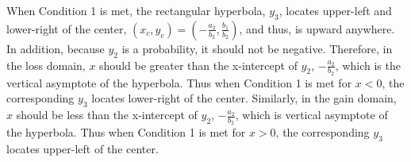 \documentclass[11pt, a4paper]{article}
\begin{document}
\noindent
When Condition 1 is met, the rectangular hyperbola, $y_3$, locates upper-left and lower-right of the center, $(x_c, y_c) = (-\frac{a_2}{b_2}, \frac{b_1}{b_2})$, and thus, is upward anywhere.\\

\noindent
In addition, because $y_2$ is a probability, it should not be negative. Therefore, in the loss domain, $x$ should be greater than the x-intercept of $y_2$, $-\frac{a_2}{b_2}$, which is the vertical asymptote of the hyperbola. Thus when Condition 1 is met for $x<0$, the corresponding $y_3$ locates lower-right of the center.
Similarly, in the gain domain, $x$ should be less than the x-intercept of $y_2$, $-\frac{a_2}{b_2}$, which is vertical asymptote of the hyperbola. Thus when Condition 1 is met for $x>0$, the corresponding $y_3$ locates upper-left of the center.\\ 




\end{document}
